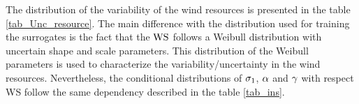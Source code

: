 \documentclass[preprint,12pt]{elsarticle}
\begin{document}
The distribution of the variability of the wind resources is presented in the table \ref{tab_Unc_resource}. The main difference with the distribution used for training the surrogates is the fact that the $\text{WS}$ follows a Weibull distribution with uncertain shape and scale parameters. This distribution of the Weibull parameters is used to characterize the variability/uncertainty in the wind resources. Nevertheless, the conditional distributions of $\sigma_{1}$, $\alpha$ and $\gamma$ with respect WS follow the same dependency described in the table \ref{tab_ins}. 

\begin{multicols}{2}
\begin{table}[H]
\begin{centering}
\caption{Uncertainty in wind resources.}
\label{tab_Unc_resource}
\end{centering}
\end{table}


\end{multicols}
\end{document}
